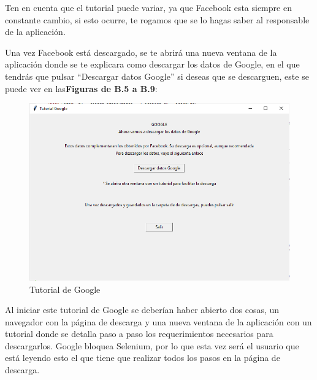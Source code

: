 Ten en cuenta que el tutorial puede variar, ya que Facebook esta siempre en constante cambio, si esto ocurre, te rogamos que se lo hagas saber al responsable de la aplicación.

Una vez Facebook está descargado, se te abrirá una nueva ventana de la aplicación donde se te explicara como descargar los datos de Google, en el que tendrás que pulsar ``Descargar datos Google'' si deseas que se descarguen, este se puede ver en las\textbf{Figuras de B.5 a B.9}:

\begin{figure}
	\begin{center}
		\includegraphics[scale=0.5]{Imagenes/Fuentes/TutorialDescargaG1.png} \caption{Tutorial de Google}
		\label{TutorialDescargaG1}
	\end{center}
\end{figure}

Al iniciar este tutorial de Google se deberían haber abierto dos cosas, un navegador con la página de descarga y una nueva ventana de la aplicación con un tutorial donde se detalla paso a paso los requerimientos necesarios para descargarlos. Google bloquea Selenium, por lo que esta vez será el usuario que está leyendo esto el que tiene que realizar todos los pasos en la página de descarga.

